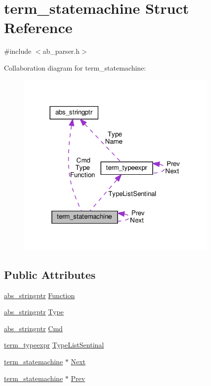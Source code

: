 \hypertarget{structterm__statemachine}{}\section{term\+\_\+statemachine Struct Reference}
\label{structterm__statemachine}


{\ttfamily \#include $<$ab\+\_\+parser.\+h$>$}



Collaboration diagram for term\+\_\+statemachine\+:\nopagebreak
\begin{figure}[H]
\begin{center}
\leavevmode
\includegraphics[width=278pt]{de/d7c/structterm__statemachine__coll__graph}
\end{center}
\end{figure}
\subsection*{Public Attributes}
\begin{DoxyCompactItemize}
\item 
\hyperlink{structabs__stringptr}{abs\+\_\+stringptr} \hyperlink{structterm__statemachine_a75ae791ed373462f997aee5483d56e99}{Function}
\item 
\hyperlink{structabs__stringptr}{abs\+\_\+stringptr} \hyperlink{structterm__statemachine_abec84e1fd19f32bad850cbbfeb8c187c}{Type}
\item 
\hyperlink{structabs__stringptr}{abs\+\_\+stringptr} \hyperlink{structterm__statemachine_added4f585b848b366c3bac9c2d29a28b}{Cmd}
\item 
\hyperlink{structterm__typeexpr}{term\+\_\+typeexpr} \hyperlink{structterm__statemachine_ababd4f7bc69e5ca15fe95a56cdb312af}{Type\+List\+Sentinal}
\item 
\hyperlink{structterm__statemachine}{term\+\_\+statemachine} $\ast$ \hyperlink{structterm__statemachine_a78279e94d1a4f84463c5d7c4fba6bc17}{Next}
\item 
\hyperlink{structterm__statemachine}{term\+\_\+statemachine} $\ast$ \hyperlink{structterm__statemachine_a4e1ec651310e6e0789f9bcb627cfaa70}{Prev}
\end{DoxyCompactItemize}


